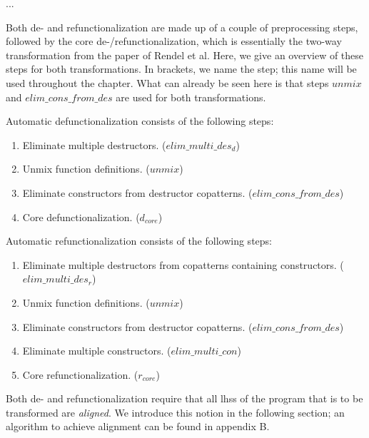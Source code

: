 
...

Both de- and refunctionalization are made up of a couple of preprocessing steps, followed by the core de-/refunctionalization, which is essentially the two-way transformation from the paper of Rendel et al. Here, we give an overview of these steps for both transformations. In brackets, we name the step; this name will be used throughout the chapter. What can already be seen here is that steps $unmix$ and $elim\_cons\_from\_des$ are used for both transformations.

Automatic defunctionalization consists of the following steps:
\begin{enumerate}
\item Eliminate multiple destructors. ($elim\_multi\_des_d$)

\item Unmix function definitions. ($unmix$)

\item Eliminate constructors from destructor copatterns. ($elim\_cons\_from\_des$)

\item Core defunctionalization. ($d_{core}$)

\end{enumerate}

Automatic refunctionalization consists of the following steps:
\begin{enumerate}
\item Eliminate multiple destructors from copatterns containing constructors. ($elim\_multi\_des_r$)

\item Unmix function definitions. ($unmix$)

\item Eliminate constructors from destructor copatterns. ($elim\_cons\_from\_des$)

\item Eliminate multiple constructors. ($elim\_multi\_con$)

\item Core refunctionalization. ($r_{core}$)

\end{enumerate}

Both de- and refunctionalization require that all lhss of the program that is to be transformed are \textit{aligned}. We introduce this notion in the following section; an algorithm to achieve alignment can be found in appendix B.

